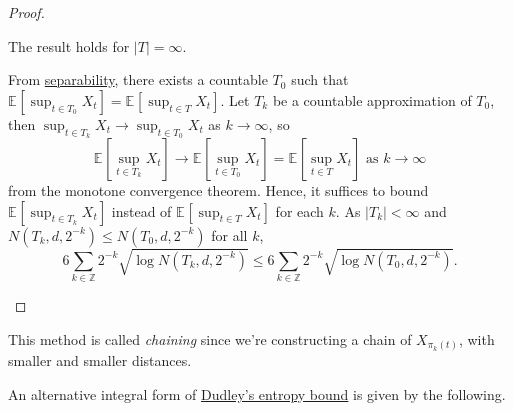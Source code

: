 \begin{proof}
	\begin{claim}
		The result holds for \(\vert T \vert = \infty \).
	\end{claim}
	\begin{explanation}
		From \hyperref[def:separable]{separability}, there exists a countable \(T_0\) such that \(\mathbb{E}_{}\left[\sup _{t\in T_0} X_t \right] = \mathbb{E}_{}\left[\sup _{t\in T} X_t \right] \). Let \(T_k\) be a countable approximation of \(T_0\), then \(\sup _{t\in T_k} X_t \to \sup _{t\in T_0} X_t \) as \(k \to \infty\), so
		\[
			\mathbb{E}_{}\left[\sup _{t\in T_k} X_t \right] \to  \mathbb{E}_{}\left[\sup _{t\in T_0} X_t \right] = \mathbb{E}_{}\left[\sup _{t\in T} X_t \right] \text{ as }k \to \infty
		\]
		from the monotone convergence theorem. Hence, it suffices to bound \(\mathbb{E}_{}\left[\sup _{t\in T_k} X_t \right] \) instead of \(\mathbb{E}_{}\left[\sup _{t\in T} X_t \right] \) for each \(k\). As \(\vert T_k \vert < \infty \) and \(N(T_k, d, 2^{-k}) \leq N(T_0, d, 2^{-k})\) for all \(k\),
		\[
			6 \sum_{k\in \mathbb{Z} } 2^{-k} \sqrt{\log N(T_k, d, 2^{-k})} \leq 6 \sum_{k\in \mathbb{Z} } 2^{-k} \sqrt{\log N(T_0, d, 2^{-k})} .
		\]
	\end{explanation}
\end{proof}

\begin{note}\label{note:chaining}
	This method is called \emph{chaining} since we're constructing a chain of \(X_{\pi _{k}(t)}\), with smaller and smaller distances.
	\begin{figure}[H]
		\centering
	\end{figure}
\end{note}

An alternative integral form of \hyperref[thm:Dudley-entropy-bound]{Dudley's entropy bound} is given by the following.

